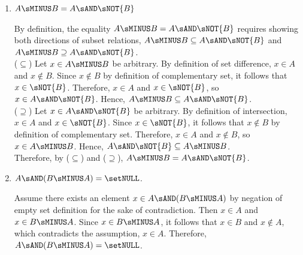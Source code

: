 \begin{enumerate}
\begin{enumerate}
    \item $A \sMINUS B = A \sAND \sNOT{B}$
    \begin{subprove}
      By definition, the equality $A \sMINUS B = A \sAND \sNOT{B}$ 
      requires showing both directions of subset relations, 
      $A \sMINUS B \subseteq A \sAND \sNOT{B}$ and 
      $A \sMINUS B \supseteq A \sAND \sNOT{B}$.\vspace*{10px}\\
      ($\subseteq$) Let $x \in A \sMINUS B$ be arbitrary.
      By definition of set difference, $x \in A$ and $x \notin B$.
      Since $x \notin B$ by definition of complementary set, it follows that $x \in \sNOT{B}$.
      Therefore, $x \in A$ and $x \in \sNOT{B}$, so $x \in A \sAND \sNOT{B}$.
      Hence, $A \sMINUS B \subseteq A \sAND \sNOT{B}$.\vspace*{10px}\\
      ($\supseteq$) Let $x \in A \sAND \sNOT{B}$ be arbitrary.
      By definition of intersection, $x \in A$ and $x \in \sNOT{B}$.
      Since $x \in \sNOT{B}$, it follows that $x \notin B$ by definition of complementary set.
      Therefore, $x \in A$ and $x \notin B$, so $x \in A \sMINUS B$.
      Hence, $A \sAND \sNOT{B} \subseteq A \sMINUS B$.\vspace*{10px}\\
      Therefore, by ($\subseteq$) and ($\supseteq$), $A \sMINUS B = A \sAND \sNOT{B}$.
    \end{subprove}
    
    \item $A \sAND (B \sMINUS A) = \setNULL$.
    \begin{subprove}
      Assume there exists an element $x \in A \sAND (B \sMINUS A)$ by negation of empty set definition for 
      the sake of contradiction. Then $x \in A$ and $x \in B \sMINUS A$.
      Since $x \in B \sMINUS A$, it follows that $x \in B$ and $x \notin A$, 
      which contradicts the assumption, $x \in A$.
      Therefore, $A \sAND (B \sMINUS A) = \setNULL$.
    \end{subprove}
    

\end{enumerate}
\end{enumerate}
